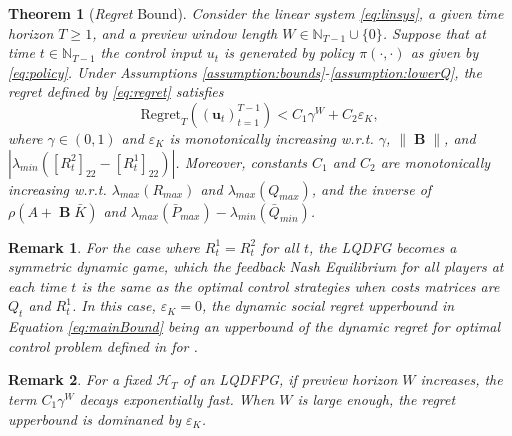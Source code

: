 \documentclass[letterpaper, 10 pt, conference]{ieeeconf}  %
\DeclareMathOperator{\contB}{\mathbf{B}}
\newtheorem{remark}{Remark}
\newtheorem{theorem}{Theorem}
\begin{document}
\begin{theorem}[\emph{Regret} Bound]\label{thm:main}
    Consider the linear system \eqref{eq:linsys}, a given time horizon $T \geq 1$, and a preview window length $W\in \mathbb{N}_{T-1} \cup \{0\}$. Suppose that at time $t \in \mathbb{N}_{T-1}$ the control input $u_t$ is generated by policy $\pi(\cdot,\cdot)$ as given by \eqref{eq:policy}. Under Assumptions \ref{assumption:bounds}-\ref{assumption:lowerQ}, the regret defined by \eqref{eq:regret} satisfies
    \begin{equation}\label{eq:mainBound}
        \text{Regret}_{T}((\mathbf{u}_{t})_{t=1}^{T-1})< C_{1}\gamma^{W} + C_{2}\varepsilon_{K},
    \end{equation}
    where $\gamma \in (0,1)$ and $\varepsilon_{K}$ is monotonically increasing w.r.t. $\gamma$, $\|\contB\|$, and $|\lambda_{min}([R_{t}^{2}]_{22}-[R_{t}^{1}]_{22})|$. Moreover, constants $C_{1}$ and $C_{2}$ are monotonically increasing w.r.t. $\lambda_{max}(R_{max})$ and $\lambda_{max}(Q_{max})$, and the inverse of $\rho(A+\contB\bar{K})$ and $\lambda_{max}(\bar{P}_{max})-\lambda_{min}(\bar{Q}_{min})$. 
    
\end{theorem}
\begin{remark}
    For the case where $R_{t}^{1} = R_{t}^{2}$ for all $t$, the LQDFG becomes a symmetric dynamic game, which the feedback Nash Equilibrium for all players at each time $t$ is the same as the optimal control strategies when costs matrices are $Q_{t}$ and $R_{t}^{1}$. In this case, $\varepsilon_{K}=0$, the \emph{dynamic social regret} upperbound in Equation \eqref{eq:mainBound} being an upperbound of the \emph{dynamic regret} for optimal control problem defined in \cite[Equation (5)]{chen_regret_2023} for \cite[Problem 1a]{chen_regret_2023}. 
\end{remark}
\begin{remark}
    For a fixed $\mathcal{H}_{T}$ of an LQDFPG, if preview horizon $W$ increases, the term $C_{1}\gamma^{W}$ decays exponentially fast. When $W$ is large enough, the \emph{regret} upperbound is dominaned by $\varepsilon_{K}$.
\end{remark}
\end{document}

